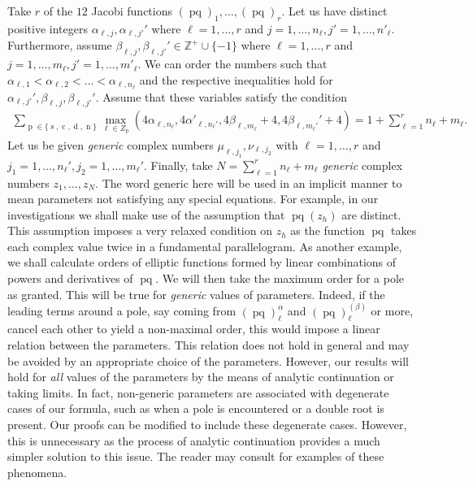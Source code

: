\documentclass[10pt,a4paper]{amsart}
\DeclareMathOperator{\pq}{pq}
\DeclareMathOperator{\p}{p}
\DeclareMathOperator{\s}{s}
\DeclareMathOperator{\cJ}{c}
\DeclareMathOperator{\dJ}{d}
\DeclareMathOperator{\n}{n}
\begin{document}
Take $r$ of the $12$ Jacobi functions $(\pq)_1,\ldots, (\pq)_r$. Let us have distinct positive integers $\alpha_{\ell,j},\alpha_{\ell,j'}'$ where $\ell=1,\ldots, r$ and $j=1,\ldots, n_\ell, j'=1,\ldots,n'_\ell$. Furthermore, assume $\beta_{\ell,j},\beta_{\ell,j'}'\in \mathbb{Z}^+\cup\{-1\}$ where $\ell=1,\ldots, r$ and $j=1,\ldots, m_\ell, j'=1,\ldots,m'_\ell$. We can order the numbers such that $\alpha_{\ell,1}< \alpha_{\ell,2}< \ldots < \alpha_{\ell,n_\ell}$ and the respective inequalities hold for $\alpha_{\ell,j'}',\beta_{\ell,j},\beta_{\ell,j'}'$. Assume that these variables satisfy the condition
\begin{align}\label{VarCond}
    \sum_{\p\in\{\s,\cJ,\dJ,\n \}} \max_{\ell\in Z_{\p}}\left(4\alpha_ {\ell,n_\ell},4\alpha'_{\ell,n_\ell'},4\beta_{\ell,m_\ell}+4,4\beta_{\ell,m_\ell'}'+4  \right)=1+\sum_{\ell=1}^r n_\ell+m_\ell.
\end{align}
Let us be given \textit{generic} complex numbers $\mu_{\ell,j_1},\nu_{\ell,j_2}$ with $\ell=1,\ldots,r$ and $j_1=1,\ldots, n_\ell', j_2=1,\ldots,m_\ell'$. Finally, take $N=\sum_{\ell=1}^r n_\ell+m_\ell$ \textit{generic} complex numbers $z_1,\ldots, z_N$. The word generic here will be used in an implicit manner to mean parameters not satisfying any special equations. For example, in our investigations we shall make use of the assumption that $\pq(z_h)$ are distinct. This assumption imposes a very relaxed condition on $z_h$ as the function $\pq$ takes each complex value twice in a fundamental parallelogram. As another example, we shall calculate orders of elliptic functions formed by linear combinations of powers and derivatives of $\pq$. We will then take the maximum order for a pole as granted. This will be true for \textit{generic} values of parameters. Indeed, if the leading terms around a pole, say coming from $(\pq)_\ell^{\alpha}$ and $(\pq)_\ell^{(\beta)}$ or more, cancel each other to yield a non-maximal order, this would impose a linear relation between the parameters. This relation does not hold in general and may be avoided by an appropriate choice of the parameters. However, our results will hold for \textit{all} values of the parameters by the means of analytic continuation or taking limits. In fact, non-generic parameters are associated with degenerate cases of our formula, such as when a pole is encountered or a double root is present. Our proofs can be modified to include these degenerate cases. However, this is unnecessary as the process of analytic continuation provides a much simpler solution to this issue. The reader may consult \cite{Gürel} for examples of these phenomena. \medskip
\end{document}
